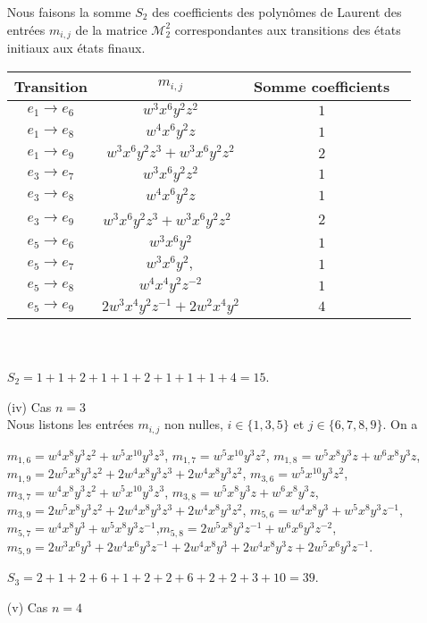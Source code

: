 \begin{itemize}
 Nous faisons la  somme $S_{2}$ des coefficients des polynômes de Laurent des entrées $m_{i,j}$ de la matrice $\mathcal{M}_{2}^{2}$  correspondantes aux transitions des états initiaux aux états finaux.
 
 \begin{tabular}{|c|c|c|c|}
 \hline
  Transition & $m_{i,j}$&Somme  coefficients\\
 \hline
  $e_{1}\rightarrow e_{6}$ & $w^3x^6y^2z^{2}$ &$1$ \\ 
 \hline
 $e_{1}\rightarrow e_{8}$ & $w^4x^6y^2z$  & $1$ \\
 \hline
 $e_{1}\rightarrow e_{9}$ & $w^3x^6y^2z^{3}+w^3x^6y^2z^{2}$ & $2$ \\
 \hline
 $e_{3}\rightarrow e_{7}$ & $w^3x^6y^2z^{2}$ & $1$ \\
 \hline
 $e_{3}\rightarrow e_{8}$ & $ w^4x^6y^2z$ & $1$ \\
 \hline
 $e_{3}\rightarrow e_{9}$ & $w^3x^6y^2z^{3}+w^3x^6y^2z^{2} $\ & $2$ \\
 \hline
  $e_{5}\rightarrow e_{6}$&$ w^3x^6y^2 $& $1$\\
 \hline
  $e_{5}\rightarrow e_{7}$&$ w^3x^6y^2, $& $1$\\
 \hline
  $e_{5}\rightarrow e_{8}$&$ w^4x^4y^2z^{-2}  $& $1$\\
 \hline
  $e_{5}\rightarrow e_{9}$&$2w^3x^4y^2z^{-1}+2w^2x^4y^2$& $4$\\
 \hline
\end{tabular}
\mbox{ }\\\\
$S_{2}=1+1+2+1+1+2+1+1+1+4=15$.

\item[(iv)] Cas $n=3$\\
 Nous listons les entrées $m_{i,j}$ non nulles, $i\in\{1,3,5\}$ et $j\in\{6,7,8,9\}$. 
 On a 
 
$m_{1,6}=w^4x^8y^3z^2+w^5x^{10}y^3z^3$,  $m_{1,7}=w^5x^{10}y^3z^2 $,  $m_{1,8}=w^5x^8y^3z+w^6x^8y^3z$,  $m_{1,9}=2w^5x^8y^3z^2+2w^4x^8y^3z^3+2w^4x^8y^3z^2$,
$m_{3,6}=w^5x^{10}y^3z^2$, $m_{3,7}=w^4x^8y^3z^2+w^5x^{10}y^3z^3 $,  $m_{3,8}=w^5x^8y^3z+w^6x^8y^3z$,  $m_{3,9}=2w^5x^8y^3z^2+2w^4x^8y^3z^3+2w^4x^8y^3z^2$, 
$m_{5,6}=w^4x^8y^3+w^5x^8y^3z^{-1}$, $m_{5,7}=w^4x^8y^3+w^5x^8y^3z^{-1}$,$m_{5,8}=2w^5x^8y^3z^{-1}+w^6x^6y^3z^{-2}$, $m_{5,9}=2w^3x^6y^3+2w^4x^6y^3z^{-1}+2w^4x^8y^3+2w^4x^8y^3z+2w^5x^6y^3z^{-1}$.

$S_{3}=2+1+2+6+1+2+2+6+2+2+3+10=39$.

\item[(v)] Cas $n=4$\\


\end{itemize}
